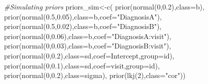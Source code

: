 \documentclass[
]{article}
\newenvironment{Shaded}{\begin{snugshade}}{\end{snugshade}}
\newcommand{\AttributeTok}[1]{\textcolor[rgb]{0.77,0.63,0.00}{#1}}
\newcommand{\CommentTok}[1]{\textcolor[rgb]{0.56,0.35,0.01}{\textit{#1}}}
\newcommand{\DecValTok}[1]{\textcolor[rgb]{0.00,0.00,0.81}{#1}}
\newcommand{\FloatTok}[1]{\textcolor[rgb]{0.00,0.00,0.81}{#1}}
\newcommand{\FunctionTok}[1]{\textcolor[rgb]{0.00,0.00,0.00}{#1}}
\newcommand{\NormalTok}[1]{#1}
\newcommand{\OtherTok}[1]{\textcolor[rgb]{0.56,0.35,0.01}{#1}}
\newcommand{\StringTok}[1]{\textcolor[rgb]{0.31,0.60,0.02}{#1}}
\begin{document}
\begin{Shaded}
\begin{Highlighting}[]
\CommentTok{\#Simulating priors}
\NormalTok{priors\_sim}\OtherTok{\textless{}{-}}\FunctionTok{c}\NormalTok{(}
\FunctionTok{prior}\NormalTok{(}\FunctionTok{normal}\NormalTok{(}\DecValTok{0}\NormalTok{,}\FloatTok{0.2}\NormalTok{),}\AttributeTok{class=}\NormalTok{b),}
\FunctionTok{prior}\NormalTok{(}\FunctionTok{normal}\NormalTok{(}\FloatTok{0.5}\NormalTok{,}\FloatTok{0.05}\NormalTok{),}\AttributeTok{class=}\NormalTok{b,}\AttributeTok{coef=}\StringTok{"DiagnosisA"}\NormalTok{),}
\FunctionTok{prior}\NormalTok{(}\FunctionTok{normal}\NormalTok{(}\FloatTok{0.5}\NormalTok{,}\FloatTok{0.02}\NormalTok{),}\AttributeTok{class=}\NormalTok{b,}\AttributeTok{coef=}\StringTok{"DiagnosisB"}\NormalTok{),}
\FunctionTok{prior}\NormalTok{(}\FunctionTok{normal}\NormalTok{(}\DecValTok{0}\NormalTok{,}\FloatTok{0.06}\NormalTok{),}\AttributeTok{class=}\NormalTok{b,}\AttributeTok{coef=}\StringTok{"DiagnosisA:visit"}\NormalTok{),}
\FunctionTok{prior}\NormalTok{(}\FunctionTok{normal}\NormalTok{(}\DecValTok{0}\NormalTok{,}\FloatTok{0.03}\NormalTok{),}\AttributeTok{class=}\NormalTok{b,}\AttributeTok{coef=}\StringTok{"DiagnosisB:visit"}\NormalTok{),}
\FunctionTok{prior}\NormalTok{(}\FunctionTok{normal}\NormalTok{(}\DecValTok{0}\NormalTok{,}\FloatTok{0.2}\NormalTok{),}\AttributeTok{class=}\NormalTok{sd,}\AttributeTok{coef=}\NormalTok{Intercept,}\AttributeTok{group=}\NormalTok{id),}
\FunctionTok{prior}\NormalTok{(}\FunctionTok{normal}\NormalTok{(}\DecValTok{0}\NormalTok{,}\FloatTok{0.1}\NormalTok{),}\AttributeTok{class=}\NormalTok{sd,}\AttributeTok{coef=}\NormalTok{visit,}\AttributeTok{group=}\NormalTok{id),}
\FunctionTok{prior}\NormalTok{(}\FunctionTok{normal}\NormalTok{(}\DecValTok{0}\NormalTok{,}\FloatTok{0.2}\NormalTok{),}\AttributeTok{class=}\NormalTok{sigma),}
\FunctionTok{prior}\NormalTok{(}\FunctionTok{lkj}\NormalTok{(}\DecValTok{2}\NormalTok{),}\AttributeTok{class=}\StringTok{"cor"}\NormalTok{))}
\end{Highlighting}
\end{Shaded}
\end{document}
